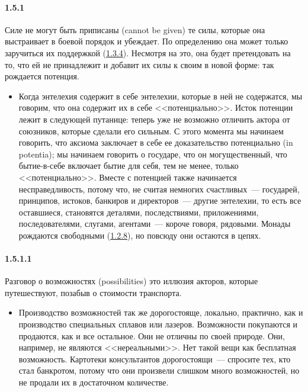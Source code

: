 \paragraph{1.5.1}\hypertarget{par:1.5.1}{} Силе не могут быть приписаны (cannot be given) те силы, которые она выстраивает в боевой порядок и убеждает. По определению она может только заручиться их поддержкой (\hyperlink{par:1.3.4}{1.3.4}). Несмотря на это, она будет претендовать на то, что ей не принадлежит и добавит их силы к своим в новой форме: так рождается потенция.
	\begin{itemize}
	\item Когда энтелехия содержит в себе энтелехии, которые в ней не содержатся, мы говорим, что она содержит их в себе <<потенциально>>. Исток потенции лежит в следующей путанице: теперь уже не возможно отличить актора от союзников, которые сделали его сильным. С этого момента мы начинаем говорить, что аксиома заключает в себе ее доказательство потенциально (in potentia); мы начинаем говорить о государе, что он могущественный, что бытие-в-себе включает бытие для себя, тем не менее, только <<потенциально>>. Вместе с потенцией также начинается несправедливость, потому что, не считая немногих счастливых~--- государей, принципов, истоков, банкиров и директоров~--- другие энтелехии, то есть все оставшиеся, становятся деталями, последствиями, приложениями, последователями, слугами, агентами~--- короче говоря, рядовыми. Монады рождаются свободными (\hyperlink{par:1.2.8}{1.2.8}), но повсюду они остаются в цепях.
	\end{itemize}

\paragraph{1.5.1.1}\hypertarget{par:1.5.1.1}{} Разговор о возможностях (possibilities) это иллюзия акторов, которые путешествуют, позабыв о стоимости транспорта.
	\begin{itemize}
	\item Производство возможностей так же дорогостояще, локально, практично, как и производство специальных сплавов или лазеров. Возможности покупаются и продаются, как и все остальное. Они не отличны по своей природе. Они, например, не являются <<нереальными>>. Нет такой вещи как бесплатная возможность. Картотеки консультантов дорогостоящи~--- спросите тех, кто стал банкротом, потому что они произвели слишком много возможностей, но не продали их в достаточном количестве.
	\end{itemize}


